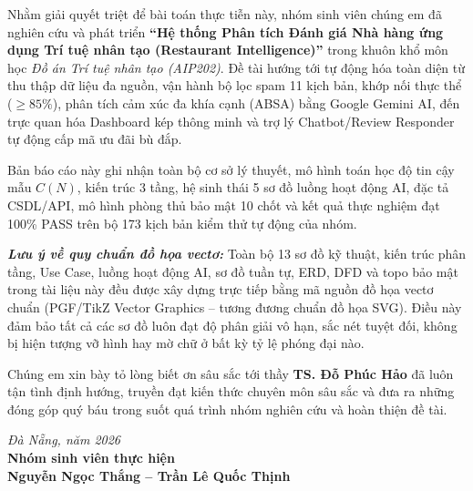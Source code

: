 \documentclass[12pt, a4paper]{article}
\begin{document}
Nhằm giải quyết triệt để bài toán thực tiễn này, nhóm sinh viên chúng em đã nghiên cứu và phát triển \textbf{``Hệ thống Phân tích Đánh giá Nhà hàng ứng dụng Trí tuệ nhân tạo (Restaurant Intelligence)''} trong khuôn khổ môn học \textit{Đồ án Trí tuệ nhân tạo (AIP202)}. Đề tài hướng tới tự động hóa toàn diện từ thu thập dữ liệu đa nguồn, vận hành bộ lọc spam 11 kịch bản, khớp nối thực thể ($\ge 85\%$), phân tích cảm xúc đa khía cạnh (ABSA) bằng Google Gemini AI, đến trực quan hóa Dashboard kép thông minh và trợ lý Chatbot/Review Responder tự động cấp mã ưu đãi bù đắp.

Bản báo cáo này ghi nhận toàn bộ cơ sở lý thuyết, mô hình toán học độ tin cậy mẫu $C(N)$, kiến trúc 3 tầng, hệ sinh thái 5 sơ đồ luồng hoạt động AI, đặc tả CSDL/API, mô hình phòng thủ bảo mật 10 chốt và kết quả thực nghiệm đạt 100\% PASS trên bộ 173 kịch bản kiểm thử tự động của nhóm.

\noindent\textit{\textbf{Lưu ý về quy chuẩn đồ họa vectơ:}} Toàn bộ 13 sơ đồ kỹ thuật, kiến trúc phân tầng, Use Case, luồng hoạt động AI, sơ đồ tuần tự, ERD, DFD và topo bảo mật trong tài liệu này đều được xây dựng trực tiếp bằng mã nguồn đồ họa vectơ chuẩn (PGF/TikZ Vector Graphics -- tương đương chuẩn đồ họa SVG). Điều này đảm bảo tất cả các sơ đồ luôn đạt độ phân giải vô hạn, sắc nét tuyệt đối, không bị hiện tượng vỡ hình hay mờ chữ ở bất kỳ tỷ lệ phóng đại nào.

Chúng em xin bày tỏ lòng biết ơn sâu sắc tới thầy \textbf{TS. Đỗ Phúc Hảo} đã luôn tận tình định hướng, truyền đạt kiến thức chuyên môn sâu sắc và đưa ra những đóng góp quý báu trong suốt quá trình nhóm nghiên cứu và hoàn thiện đề tài.

\vspace{0.35cm}
\begin{flushright}
\textit{Đà Nẵng, năm 2026}\\[0.2cm]
\textbf{Nhóm sinh viên thực hiện}\\[1.2cm] %
\textbf{Nguyễn Ngọc Thắng -- Trần Lê Quốc Thịnh}
\end{flushright}

\newpage
\tableofcontents

\newpage
\begingroup
\setlength{\cftbeforetabskip}{0.5pt}
\listoftables
{}
\endgroup

\newpage
\begingroup
\setlength{\cftbeforefigskip}{0.5pt}
\listoffigures
{}
\endgroup
\end{document}
